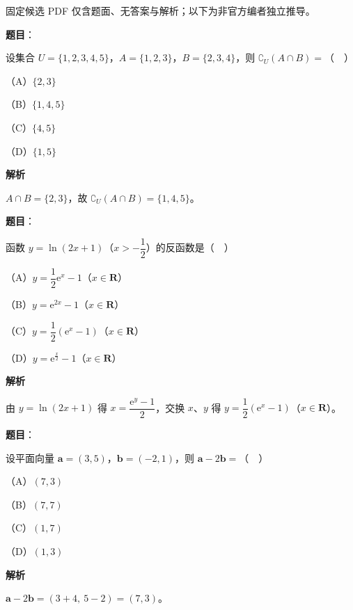 

\begin{gktip}
固定候选 PDF 仅含题面、无答案与解析；以下为非官方编者独立推导。
\end{gktip}

\begin{answer}

\textbf{题目}：

设集合 $U=\{1,2,3,4,5\}$，$A=\{1,2,3\}$，$B=\{2,3,4\}$，则 $\complement_U(A\cap B)=$（　）

（A）$\{2,3\}$

（B）$\{1,4,5\}$

（C）$\{4,5\}$

（D）$\{1,5\}$

\textbf{解析}

$A\cap B=\{2,3\}$，故 $\complement_U(A\cap B)=\{1,4,5\}$。


\end{answer}
\begin{answer}

\textbf{题目}：

函数 $y=\ln(2x+1)$（$x>-\dfrac12$）的反函数是（　）

（A）$y=\dfrac12\mathrm e^x-1$（$x\in\mathbf R$）

（B）$y=\mathrm e^{2x}-1$（$x\in\mathbf R$）

（C）$y=\dfrac12(\mathrm e^x-1)$（$x\in\mathbf R$）

（D）$y=\mathrm e^{\frac x2}-1$（$x\in\mathbf R$）

\textbf{解析}

由 $y=\ln(2x+1)$ 得 $x=\dfrac{\mathrm e^y-1}2$，交换 $x$、$y$ 得 $y=\dfrac12(\mathrm e^x-1)$（$x\in\mathbf R$）。


\end{answer}
\begin{answer}

\textbf{题目}：

设平面向量 $\boldsymbol a=(3,5)$，$\boldsymbol b=(-2,1)$，则 $\boldsymbol a-2\boldsymbol b=$（　）

（A）$(7,3)$

（B）$(7,7)$

（C）$(1,7)$

（D）$(1,3)$

\textbf{解析}

$\boldsymbol a-2\boldsymbol b=(3+4,\ 5-2)=(7,3)$。


\end{answer}
